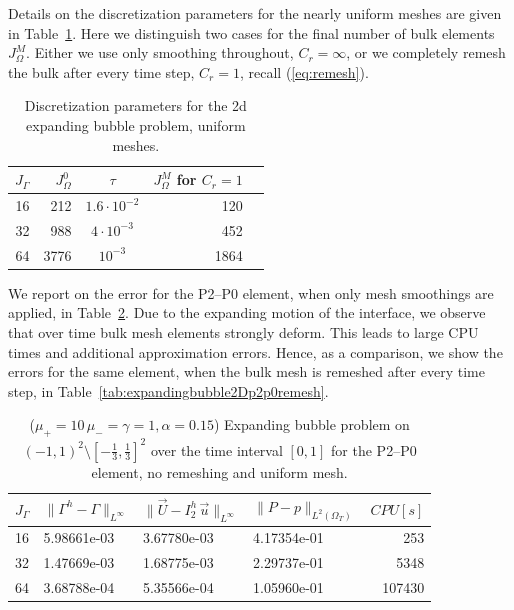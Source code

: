 \documentclass[a4paper,12pt,onecolumn]{article}
\newcommand{\errorXx}{\|\Gamma^h - \Gamma\|_{L^\infty}}
\newcommand{\errorUu}[1]{\|\vec U - I^h_{#1}\,\vec u\|_{L^\infty}}
\newcommand{\LerrorPp}{\|P - p\|_{L^2(\Omega_T)}}
\begin{document}
Details on the discretization parameters for the nearly uniform meshes are
given in Table~\ref{tab:expandingbubble2Delements}. Here we distinguish two
cases for the final number of bulk elements $J_\Omega^M$. Either we use only
smoothing throughout, $C_r = \infty$, or we completely remesh the bulk after
every time step, $C_r = 1$, recall (\ref{eq:remesh}).
\begin{table}
\center
\begin{tabular}{rrcrr}
\hline
$J_\Gamma$ & $J_\Omega^0$ & $\tau$ & $J_\Omega^M$ for $C_r=1$ \\
\hline
16 &  212 & $1.6\cdot10^{-2}$ &  120 \\
32 &  988 &   $4\cdot10^{-3}$ &  452 \\
64 & 3776 &         $10^{-3}$ & 1864 \\
\hline
\end{tabular}
\caption{Discretization parameters for the 2d expanding bubble problem,
uniform meshes.}
\label{tab:expandingbubble2Delements}
\end{table}
We report on the error for the P2--P0 element, when only mesh smoothings are
applied, in Table~\ref{tab:expandingbubble2Dp2p0smooth}. Due to the expanding
motion of the interface, we observe that over time bulk mesh elements strongly
deform. This leads to large CPU times and additional approximation errors.
Hence, as a comparison, we show the errors for the same element, when the bulk
mesh is remeshed after every time step, in
Table~\ref{tab:expandingbubble2Dp2p0remesh}.
\begin{table}
 \center
\begin{tabular}{llllr}
\hline
$J_\Gamma$ & $\errorXx$ & $\errorUu2$ & $\LerrorPp$ & $CPU[s]$\\
\hline
16 & 5.98661e-03 & 3.67780e-03 & 4.17354e-01 &    253 \\
32 & 1.47669e-03 & 1.68775e-03 & 2.29737e-01 &   5348 \\
64 & 3.68788e-04 & 5.35566e-04 & 1.05960e-01 & 107430 \\
\hline
\end{tabular}
\caption{($\mu_+ = 10\,\mu_- = \gamma = 1,\alpha = 0.15$) Expanding bubble
problem on $(-1,1)^2\setminus[-\frac{1}{3},\frac{1}{3}]^2$ over the time
interval $[0,1]$ for the P2--P0 element, no remeshing and uniform mesh.}
\label{tab:expandingbubble2Dp2p0smooth}
\end{table}
\end{document}
